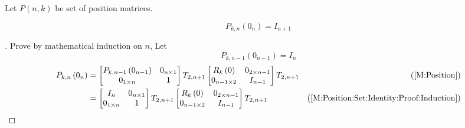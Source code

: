 \documentclass[stu, babel, american, biblatex, a4paper, leqno, draftall]{apa7}
\begin{document}
\begin{definition}\label{M:Position:Set}
    Let $P\left(n,k\right)$ be set of position matrices.
\end{definition}
\begin{corollary}\label{M:Position:Set:Identity}
    \begin{equation*}
    	P_{k,n}
    	\left(0_{n}\right)
    	=
    	I_{n+1}
    \end{equation*}
\end{corollary}
\begin{proof}[]
    Prove by mathematical induction on $n$,
    Let 
    \begin{equation}\label{M:Position:Set:Identity:Proof:Induction}
        P_{k,n-1}\left(0_{n-1}\right)=I_n
    \end{equation}
	\begin{align*}
		P_{k, n}\left(0_{n}\right)
		&=
		\begin{bmatrix}
            P_{k,n-1}\left(0_{n-1}\right) & 0_{n\times 1} \\
            0_{1\times n}                                                                                      & 1 \\
        \end{bmatrix}
        T_{2, n+1}
        \begin{bmatrix}
            R_{k}\left(0\right) & 0_{{2}\times{n-1}} \\
            0_{{n-1}\times{2}}                                   & {I}_{n-1} \\
        \end{bmatrix}
        T_{2, n+1} & \text{(\cref{M:Position})} \\
		&=
		\begin{bmatrix}
            I_{n} & 0_{n\times 1} \\
            0_{1\times n}                                                                                      & 1 \\
        \end{bmatrix}
        T_{2, n+1}
        \begin{bmatrix}
            R_{k}\left(0\right) & 0_{{2}\times{n-1}} \\
            0_{{n-1}\times{2}}                                   & {I}_{n-1} \\
        \end{bmatrix}
        T_{2, n+1} & \text{(\cref{M:Position:Set:Identity:Proof:Induction})} \\

\end{align*}
\end{proof}
\end{document}

